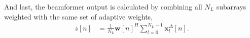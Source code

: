 \documentclass[conference]{IEEEtran}
\newcommand{\mat}[1]{\mathbf{#1}}
\renewcommand{\vec}[1]{\mathbf{#1}}
\begin{document}
And last, the beamformer output is calculated by combining all $N_L$ subarrays weighted with the same set of adaptive weights,
\begin{align}
z[n] &= \frac{1}{N_L}\vec{w}[n]^H \sum_{l=0}^{N_L-1} \vec{x}_l^{\Delta}[n]. \label{eq:z_mv}
\end{align}


\end{document}
